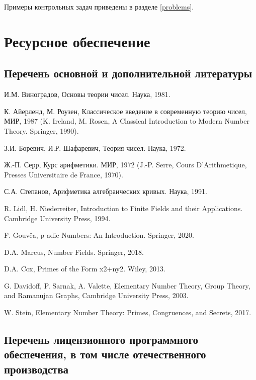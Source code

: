\documentclass[a4paper, 12pt]{article}
\begin{document}
Примеры контрольных задач приведены в разделе \ref{problems}.

\section{Ресурсное обеспечение}

\subsection{Перечень основной и дополнительной литературы}

\begin{thebibliography}{Serre}
    
    И.М. Виноградов, Основы теории чисел. Наука, 1981.

    К. Айерленд, М. Роузен, Классическое введение в современную теорию чисел, МИР, 1987 (K. Ireland, M. Rosen, A Classical Introduction to Modern Number Theory. Springer, 1990).

    З.И. Боревич, И.Р. Шафаревич, Теория чисел. Наука, 1972.

    Ж.-П. Серр, Курс арифметики. МИР, 1972 (J.-P. Serre, Cours D’Arithmetique, Presses Universitaire de France, 1970).

    С.А. Степанов, Арифметика алгебраических кривых. Наука, 1991.

    R. Lidl, H. Niederreiter, Introduction to Finite Fields and their Applications. Cambridge University Press, 1994.

    F. Gouvêa, p-adic Numbers: An Introduction. Springer, 2020.

    D.A. Marcus, Number Fields. Springer, 2018.

    D.A. Cox, Primes of the Form x2+ny2. Wiley, 2013.

    G. Davidoff, P. Sarnak, A. Valette, Elementary Number Theory, Group Theory, and Ramanujan Graphs, Cambridge University Press, 2003.

    W. Stein, Elementary Number Theory: Primes, Congruences, and Secrets, 2017.

\end{thebibliography}

\subsection{Перечень лицензионного программного обеспечения, в том числе отечественного производства}
\end{document}
